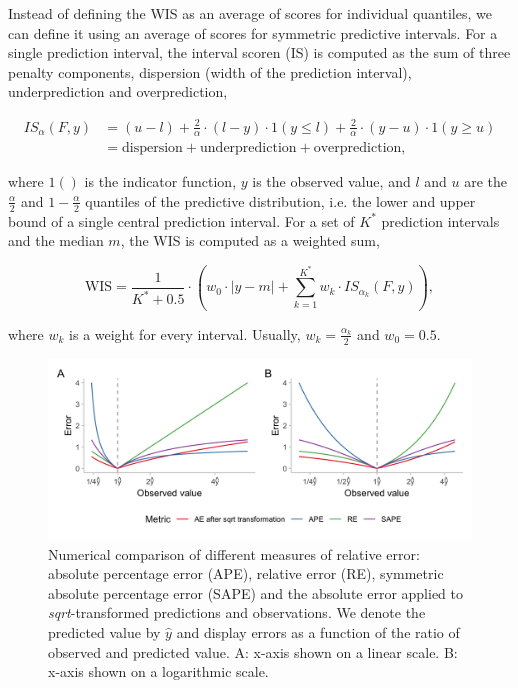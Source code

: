 \documentclass{article}
\begin{document}
Instead of defining the WIS as an average of scores for individual quantiles, we can define it using an average of scores for symmetric predictive intervals. For a single prediction interval, the interval scoren (IS) is computed as the sum of three penalty components, dispersion (width of the prediction interval), underprediction and overprediction,  
%
\begin{linenomath*}
\begin{align*}
 IS_\alpha(F,y) &= (u-l) + \frac{2}{\alpha} \cdot (l-y) \cdot 1(y \leq l) + \frac{2}{\alpha} \cdot (y-u) \cdot 1(y \geq u) \\
 &= \text{dispersion} + \text{underprediction} + \text{overprediction},    
\end{align*}
\end{linenomath*}
%
where $1()$ is the indicator function, $y$ is the observed value, and $l$ and $u$ are the $\frac{\alpha}{2}$ and $1 - \frac{\alpha}{2}$ quantiles of the predictive distribution, i.e. the lower and upper bound of a single central prediction interval. For a set of $K^*$ prediction intervals and the median $m$, the WIS is computed as a weighted sum, 
\begin{linenomath*}
\begin{equation*}
\text{WIS} = \frac{1}{K^* + 0.5} \cdot \left(w_0 \cdot |y - m| + \sum_{k = 1}^{K^*} w_k \cdot IS_{\alpha_{k}}(F, y)\right),    
\end{equation*} 
\end{linenomath*}
where $w_k$ is a weight for every interval. Usually, $w_k = \frac{\alpha_k}{2}$ and $w_0 = 0.5$. 


\begin{figure}[h!]
\centering
\includegraphics[width = 1\textwidth]{output/figures/different-relative-errors-sqrt.png}
\caption{Numerical comparison of different measures of relative error: absolute percentage error (APE), relative error (RE), symmetric absolute percentage error (SAPE) and the absolute error applied to \textit{sqrt}-transformed predictions and observations. We denote the predicted value by $\hat{y}$ and display errors as a function of the ratio of observed and predicted value. A: x-axis shown on a linear scale. B: x-axis shown on a logarithmic scale.}
\label{fig:SAPE-sqrt}
\end{figure}
\end{document}
